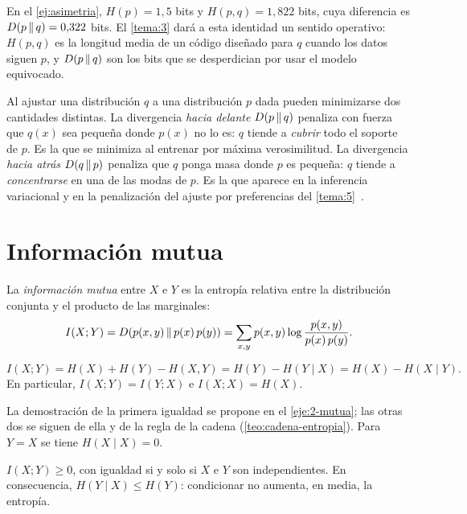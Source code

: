 En el \cref{ej:asimetria}, $H(p)=1{,}5$ bits y $H(p,q)=1{,}822$ bits, cuya diferencia es $D(p\,\|\,q)=0{,}322$ bits. El \cref{tema:3} dará a esta identidad un sentido operativo: $H(p,q)$ es la longitud media de un código diseñado para $q$ cuando los datos siguen $p$, y $D(p\,\|\,q)$ son los bits que se desperdician por usar el modelo equivocado.

\addtocounter{definicion}{1}%

\begin{observacion}\label{obs:direcciones}
Al ajustar una distribución $q$ a una distribución $p$ dada pueden minimizarse dos cantidades distintas. La divergencia \emph{hacia delante} $D(p\,\|\,q)$ penaliza con fuerza que $q(x)$ sea pequeña donde $p(x)$ no lo es: $q$ tiende a \emph{cubrir} todo el soporte de $p$. Es la que se minimiza al entrenar por máxima verosimilitud. La divergencia \emph{hacia atrás} $D(q\,\|\,p)$ penaliza que $q$ ponga masa donde $p$ es pequeña: $q$ tiende a \emph{concentrarse} en una de las modas de $p$. Es la que aparece en la inferencia variacional y en la penalización del ajuste por preferencias del \cref{tema:5}~\cite{camit}.
\end{observacion}

\section{Información mutua}

\begin{definicion}\label{def:mutua}
La \emph{información mutua} entre $X$ e $Y$ es la entropía relativa entre la distribución conjunta y el producto de las marginales:
\[
I(X;Y)=D(p(x,y)\,\|\,p(x)\,p(y))=\sum_{x,y}p(x,y)\log\frac{p(x,y)}{p(x)\,p(y)}.
\]
\end{definicion}

\begin{proposicion}\label{prop:mutua-identidades}
\[
I(X;Y)=H(X)+H(Y)-H(X,Y)=H(Y)-H(Y\mid X)=H(X)-H(X\mid Y).
\]
En particular, $I(X;Y)=I(Y;X)$ e $I(X;X)=H(X)$.
\end{proposicion}

La demostración de la primera igualdad se propone en el \cref{eje:2-mutua}; las otras dos se siguen de ella y de la regla de la cadena (\cref{teo:cadena-entropia}). Para $Y=X$ se tiene $H(X\mid X)=0$.

\begin{teorema}\label{teo:mutua-positiva}
$I(X;Y)\ge 0$, con igualdad si y solo si $X$ e $Y$ son independientes. En consecuencia, $H(Y\mid X)\le H(Y)$: condicionar no aumenta, en media, la entropía.
\end{teorema}

